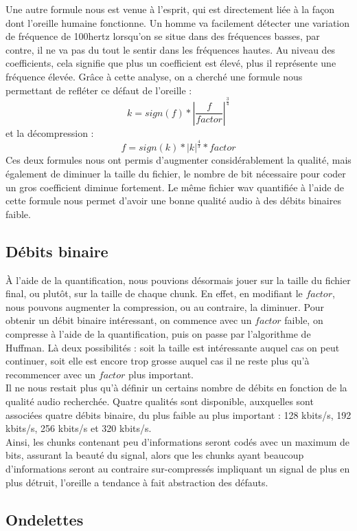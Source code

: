 \documentclass[a4paper,12pt]{report}
\begin{document}
Une autre formule nous est venue à l'esprit, qui est directement liée à la façon
dont l'oreille humaine fonctionne. Un homme va facilement détecter une variation
de fréquence de 100hertz lorsqu'on se situe dans des fréquences basses, par
contre, il ne va pas du tout le sentir dans les fréquences hautes. Au niveau des
coefficients, cela signifie que plus un coefficient est élevé, plus il
représente une fréquence élevée. Grâce à cette analyse, on a cherché une formule
nous permettant de refléter ce défaut de l'oreille :
$$ k = sign\left(f\right) * \left|\frac{f}{factor}\right|^{\frac{3}{4}}$$
et la décompression :
$$ f = sign\left(k\right) * \left|k\right|^{\frac{4}{3}} * factor$$
Ces deux formules nous ont permis d'augmenter considérablement la qualité, mais
également de diminuer la taille du fichier, le nombre de bit nécessaire pour
coder un gros coefficient diminue fortement. Le même fichier wav quantifiée à
l'aide de cette formule nous permet d'avoir une bonne qualité audio à des débits
binaires faible.
\subsection{Débits binaire}
À l'aide de la quantification, nous pouvions désormais jouer sur la taille du
fichier final, ou plutôt, sur la taille de chaque chunk. En effet, en modifiant
le $factor$, nous pouvons augmenter la compression, ou au contraire, la
diminuer. Pour obtenir un débit binaire intéressant, on commence avec un
$factor$ faible, on compresse à l'aide de la quantification, puis on passe par
l'algorithme de Huffman. Là deux possibilités : soit la taille est intéressante
auquel cas on peut continuer, soit elle est encore trop grosse auquel cas il ne
reste plus qu'à recommencer avec un $factor$ plus important.\\
Il ne nous restait plus qu'à définir un certains nombre de débits en fonction de
la qualité audio recherchée. Quatre qualités sont disponible, auxquelles sont
associées quatre débits binaire, du plus faible au plus important : 128 kbits/s,
192 kbits/s, 256 kbits/s et 320 kbits/s.\\
Ainsi, les chunks contenant peu d'informations seront codés avec un maximum de
bits, assurant la beauté du signal, alors que les chunks ayant beaucoup
d'informations seront au contraire sur-compressés impliquant un signal de plus
en plus détruit, l'oreille a tendance à fait abstraction des défauts.
\subsection{Ondelettes}
\end{document}
